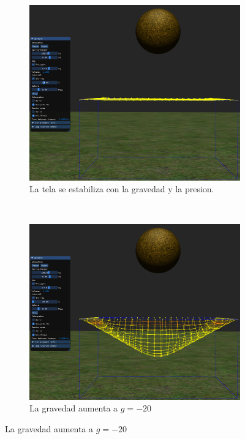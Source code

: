 \begin{figure}
 \centering
  \begin{subfigure}[b]{0.45\textwidth}
    \includegraphics[width=\textwidth]{Img/04/gravity1}
    \caption{La tela se estabiliza con la gravedad y la presion.}
    \label{fig:testGEstable}
  \end{subfigure}
~
  \begin{subfigure}[b]{0.45\textwidth}
    \includegraphics[width=\textwidth]{Img/04/gravity2}
    \caption{La gravedad aumenta a $g=-20$}
    \label{fig:testGAumenta}

\end{subfigure}
\end{figure}
